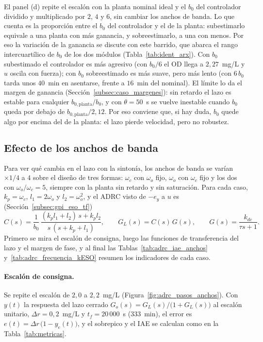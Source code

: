 El panel (d) repite el escalón con la planta nominal ideal y el $b_0$ del
controlador dividido y multiplicado por $2$, $4$ y $6$, sin cambiar los anchos de
banda. Lo que cuenta es la proporción entre el $b_0$ del controlador y el de la
planta: subestimarlo equivale a una planta con más ganancia, y sobreestimarlo, a
una con menos. Por eso la variación de la ganancia se discute con este barrido, que
abarca el rango intercuartílico de $b_0$ de los dos módulos (Tabla~\ref{tab:ident_arx}). Con $b_0$ subestimado el controlador es más agresivo (con $b_0/6$
el OD llega a $2{,}27$~mg/L y $u$ oscila con fuerza); con $b_0$ sobreestimado es
más suave, pero más lento (con $6\,b_0$ tarda unos $40$~min en asentarse, frente a
$16$~min del nominal). El límite lo da el margen de ganancia (Sección~\ref{subsec:caso_margenes}): sin retardo el lazo es estable
para cualquier $b_{0,\mathrm{planta}}/b_0$, y con $\theta = 50$~s se vuelve inestable cuando $b_0$ queda por debajo de
$b_{0,\mathrm{planta}}/2{,}12$. Por eso conviene que, si hay duda, $b_0$ quede algo
por encima del de la planta: el lazo pierde velocidad, pero no robustez.

\subsection{Efecto de los anchos de banda}
\label{subsec:caso_mapas}

Para ver qué cambia en el lazo con la sintonía, los anchos de banda se varían
$\times 1/4$ a $4$ sobre el diseño de tres formas: $\omega_c$ con $\omega_o$
fijo, $\omega_o$ con $\omega_c$ fijo y los dos con $\omega_o/\omega_c = 5$,
siempre con la planta sin retardo y sin saturación. Para cada caso,
$k_p = \omega_c$, $l_1 = 2\omega_o$ y $l_2 = \omega_o^2$, y el ADRC visto de
$-e_y$ a $u$ es (Sección~\ref{subsec:gpi_eso_tf})
\begin{equation}
C(s) = \frac{1}{b_0}\,\frac{(k_p l_1 + l_2)\,s + k_p l_2}{s\,(s + k_p + l_1)} ,
\qquad
G_L(s) = C(s)\,G(s) ,
\qquad
G(s) = \frac{k_{dc}}{\tau s + 1} .
\label{eq:mapa_C}
\end{equation}
Primero se mira el escalón de consigna, luego las funciones de transferencia
del lazo y el margen de fase, y al final las Tablas~\ref{tab:adrc_iae_anchos}
y~\ref{tab:adrc_frecuencia_kESO} resumen los indicadores de cada caso.

\paragraph{Escalón de consigna.}
Se repite el escalón de $2{,}0$ a $2{,}2$~mg/L
(Figura~\ref{fig:adrc_pasos_anchos}). Con $y(t)$ la respuesta del
lazo cerrado $G_o(s) = G_L(s)/\bigl(1 + G_L(s)\bigr)$ al escalón unitario, $\Delta r = 0{,}2$~mg/L y
$t_f = 20\,000$~s (333~min), el error es $e(t) = \Delta r\,\bigl(1 - y_{e}(t)\bigr)$, y el sobrepico y el IAE se
calculan como en la Tabla~\ref{tab:metricas}.

